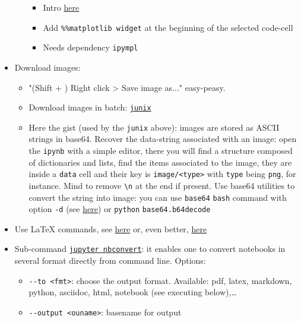 \documentclass[a4paper,12pt,%
              final%
              ]{article}
\begin{document}
\begin{itemize}
\begin{itemize}
        \begin{itemize}
          \item Intro \href{https://matplotlib.org/stable/users/explain/figure/interactive.html#ipython-integration}{here}
          \item Add \verb|%%matplotlib widget| at the beginning of the selected code-cell
          \item Needs dependency \texttt{ipympl}
        \end{itemize}
    \end{itemize}
  \item Download images:
    \begin{itemize}
      \item "(Shift + ) Right click > Save image as..." easy-peasy.
      \item Download images in batch: \href{https://github.com/damienmarlier51/JupyterNotebookImageExporter}{\texttt{junix}}
      \item Here the gist (used by the \texttt{junix} above): images are stored as ASCII strings in base64. Recover the data-string associated with an image: open the \texttt{ipynb} with a simple editor, there you will find a structure composed of dictionaries and lists, find the items associated to the image, they are inside a \texttt{data} cell and their key is \texttt{image/<type>} with \texttt{type} being \texttt{png}, for instance. Mind to remove \verb|\n| at the end if present. Use base64 utilities to convert the string into image: you can use \texttt{base64} \texttt{bash} command with option \verb|-d| (see \href{https://askubuntu.com/questions/907540/how-to-decode-an-image-string-using-base64-in-command-line}{here}) or \texttt{python} \verb|base64.b64decode|
    \end{itemize}
  \item Use \LaTeX{} commands, see \href{https://stackoverflow.com/questions/13208286/how-to-write-latex-in-ipython-notebook}{here} or, even better, \href{https://jupyterbook.org/content/math.html}{here}
  \item Sub-command \href{https://nbconvert.readthedocs.io/en/latest/usage.html}{\texttt{jupyter nbconvert}}: it enables one to convert notebooks in several format directly from command line. Options:
    \begin{itemize}
      \item \verb|--to <fmt>|: choose the output format. Available: pdf, latex, markdown, python, asciidoc, html, notebook (see executing below),\ldots
      \item \verb|--output <ouname>|: basename for output

\end{itemize}
\end{itemize}
\end{document}
